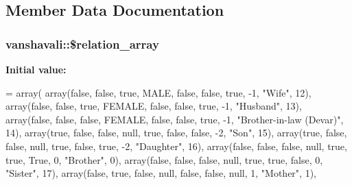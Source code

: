 \subsection{Member Data Documentation}
\hypertarget{classvanshavali_a55652a5f790bf930fa757ca553fd1cdb}{
\subsubsection[{\$relation\-\_\-array}]{\setlength{\rightskip}{0pt plus 5cm}vanshavali\-::\$relation\-\_\-array\hspace{0.3cm}{\ttfamily [private]}}}\label{classvanshavali_a55652a5f790bf930fa757ca553fd1cdb}
{\bfseries Initial value\-:}
\begin{DoxyCode}
= array(
        array(\textcolor{keyword}{false}, \textcolor{keyword}{false}, \textcolor{keyword}{true}, MALE, \textcolor{keyword}{false}, \textcolor{keyword}{false}, \textcolor{keyword}{true}, -1, \textcolor{stringliteral}{"Wife"}, 12),
        array(\textcolor{keyword}{false}, \textcolor{keyword}{false}, \textcolor{keyword}{true}, FEMALE, \textcolor{keyword}{false}, \textcolor{keyword}{false}, \textcolor{keyword}{true}, -1, \textcolor{stringliteral}{"Husband"}, 13),
        array(\textcolor{keyword}{false}, \textcolor{keyword}{false}, \textcolor{keyword}{false}, FEMALE, \textcolor{keyword}{false}, \textcolor{keyword}{false}, \textcolor{keyword}{true}, -1, \textcolor{stringliteral}{"Brother-in-law (Devar)"}, 14),
        array(\textcolor{keyword}{true}, \textcolor{keyword}{false}, \textcolor{keyword}{false}, null, \textcolor{keyword}{true}, \textcolor{keyword}{false}, \textcolor{keyword}{false}, -2, \textcolor{stringliteral}{"Son"}, 15),
        array(\textcolor{keyword}{true}, \textcolor{keyword}{false}, \textcolor{keyword}{false}, null, \textcolor{keyword}{true}, \textcolor{keyword}{false}, \textcolor{keyword}{true}, -2, \textcolor{stringliteral}{"Daughter"}, 16),
        array(\textcolor{keyword}{false}, \textcolor{keyword}{false}, \textcolor{keyword}{false}, null, \textcolor{keyword}{true}, \textcolor{keyword}{true}, True, 0, \textcolor{stringliteral}{"Brother"}, 0),
        array(\textcolor{keyword}{false}, \textcolor{keyword}{false}, \textcolor{keyword}{false}, null, \textcolor{keyword}{true}, \textcolor{keyword}{true}, \textcolor{keyword}{false}, 0, \textcolor{stringliteral}{"Sister"}, 17),
        array(\textcolor{keyword}{false}, \textcolor{keyword}{true}, \textcolor{keyword}{false}, null, \textcolor{keyword}{false}, \textcolor{keyword}{false}, null, 1, \textcolor{stringliteral}{"Mother"}, 1),

\end{DoxyCode}
